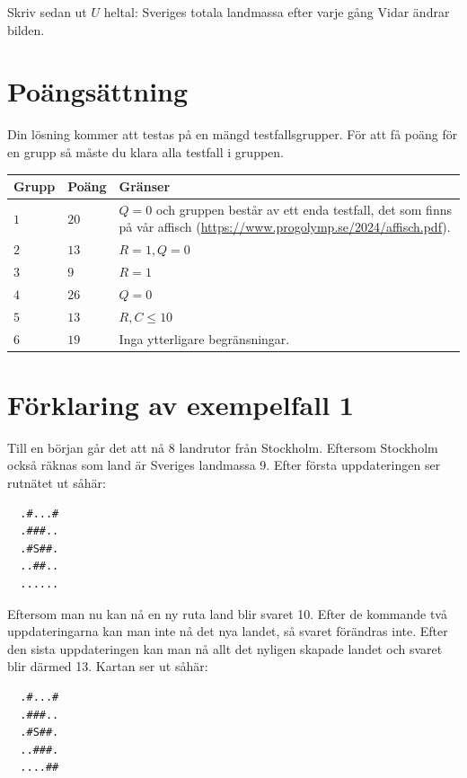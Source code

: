 Skriv sedan ut $U$ heltal: Sveriges totala landmassa efter varje gång Vidar ändrar bilden.

\section*{Poängsättning}
Din lösning kommer att testas på en mängd testfallsgrupper.
För att få poäng för en grupp så måste du klara alla testfall i gruppen.

\noindent
\begin{tabular}{| l | l | p{12cm} |}
  \hline
  \textbf{Grupp} & \textbf{Poäng} & \textbf{Gränser} \\ \hline
  $1$    & $20$       & $Q=0$ och gruppen består av ett enda testfall, det som finns på vår affisch (\url{https://www.progolymp.se/2024/affisch.pdf}). \\ \hline
  $2$    & $13$       & $R=1, Q=0$ \\ \hline
  $3$    & $9$        & $R=1$ \\ \hline
  $4$    & $26$       & $Q=0$ \\ \hline
  $5$    & $13$       & $R,C \le 10$ \\ \hline
  $6$    & $19$       & Inga ytterligare begränsningar. \\ \hline
\end{tabular}

\section*{Förklaring av exempelfall 1}
Till en början går det att nå 8 landrutor från Stockholm. Eftersom Stockholm också räknas som land är Sveriges landmassa 9. Efter första uppdateringen ser rutnätet ut såhär:

\noindent
\begin{verbatim}
  .#...#
  .###..
  .#S##.
  ..##..
  ......
\end{verbatim}

\noindent
Eftersom man nu kan nå en ny ruta land blir svaret 10. Efter de kommande två uppdateringarna kan man inte nå det nya landet, så svaret förändras inte.
Efter den sista uppdateringen kan man nå allt det nyligen skapade landet och svaret blir därmed 13. Kartan ser ut såhär:

\noindent
\begin{verbatim}
  .#...#
  .###..
  .#S##.
  ..###.
  ....##
\end{verbatim}